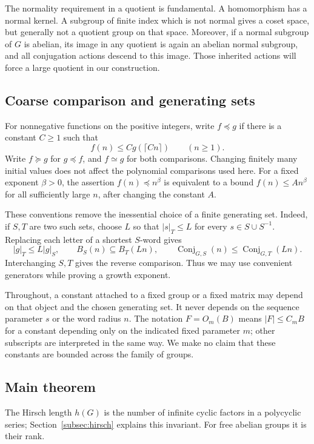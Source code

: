 \documentclass[11pt]{article}
\numberwithin{equation}{section}
\theoremstyle{definition}
\theoremstyle{remark}
\newcommand{\Conj}{\operatorname{Conj}}
\begin{document}
The normality requirement in a quotient is fundamental. A homomorphism has a normal kernel. A subgroup of finite index which is not normal gives a coset space, but generally not a quotient group on that space. Moreover, if a normal subgroup of $G$ is abelian, its image in any quotient is again an abelian normal subgroup, and all conjugation actions descend to this image. Those inherited actions will force a large quotient in our construction.

\subsection{Coarse comparison and generating sets}
For nonnegative functions on the positive integers, write $f\preceq g$ if there is a constant $C\ge1$ such that
\[
f(n)\le C g(\lceil Cn\rceil)\qquad(n\ge1).
\]
Write $f\succeq g$ for $g\preceq f$, and $f\simeq g$ for both comparisons. Changing finitely many initial values does not affect the polynomial comparisons used here. For a fixed exponent $\beta>0$, the assertion $f(n)\preceq n^\beta$ is equivalent to a bound $f(n)\le A n^\beta$ for all sufficiently large $n$, after changing the constant $A$.

These conventions remove the inessential choice of a finite generating set. Indeed, if $S,T$ are two such sets, choose $L$ so that $|s|_T\le L$ for every $s\in S\cup S^{-1}$. Replacing each letter of a shortest $S$-word gives
\[
|g|_T\le L|g|_S,\qquad
B_S(n)\subseteq B_T(Ln),\qquad
\Conj_{G,S}(n)\le\Conj_{G,T}(Ln).
\]
Interchanging $S,T$ gives the reverse comparison. Thus we may use convenient generators while proving a growth exponent.

Throughout, a constant attached to a fixed group or a fixed matrix may depend on that object and the chosen generating set. It never depends on the sequence parameter $s$ or the word radius $n$. The notation $F=O_m(B)$ means $|F|\le C_m B$ for a constant depending only on the indicated fixed parameter $m$; other subscripts are interpreted in the same way. We make no claim that these constants are bounded across the family of groups.

\subsection{Main theorem}
The Hirsch length $h(G)$ is the number of infinite cyclic factors in a polycyclic series; Section~\ref{subsec:hirsch} explains this invariant. For free abelian groups it is their rank.
\end{document}

